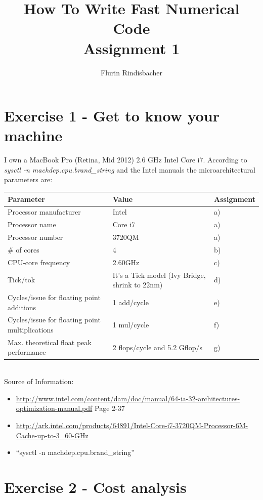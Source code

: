 \documentclass[10pt,a4paper,oneside,notitlepage]{report}
\author{Flurin Rindisbacher}
\title{How To Write Fast Numerical Code \\ \vspace{6 mm} \textbf{Assignment 1}}
\begin{document}
\maketitle

\section*{Exercise 1 - Get to know your machine}
I own a MacBook Pro (Retina, Mid 2012) 2.6 GHz Intel Core i7. According to \textit{sysctl -n machdep.cpu.brand\_string} and the Intel manuals the microarchitectural parameters are: \\

\begin{tabular}{|l|l|l|}
\hline 
\rowcolor{gray!30}
\textbf{Parameter} & \textbf{Value} & \textbf{Assignment} \\ 
\hline 
Processor manufacturer & Intel & a)\\ 
\hline 
Processor name & Core i7 & a)\\ 
\hline
Processor number & 3720QM  & a)\\ 
\hline
\# of cores & 4  & b) \\ 
\hline 
CPU-core frequency & 2.60GHz  & c)\\ 
\hline 
Tick/tok & It's a Tick model (Ivy Bridge, shrink to 22nm) & d) \\ 
\hline 
Cycles/issue for floating point additions & 1 add/cycle & e) \\ 
\hline 
Cycles/issue for floating point multiplications & 1 mul/cycle & f) \\ 
\hline 
Max. theoretical float peak performance & 2 flops/cycle and 5.2 Gflop/s & g) \\ 
\hline 
\end{tabular} 
\\
Source of Information:
\begin{itemize}
  \item \url{http://www.intel.com/content/dam/doc/manual/64-ia-32-architectures-optimization-manual.pdf} Page 2-37
  \item \url{http://ark.intel.com/products/64891/Intel-Core-i7-3720QM-Processor-6M-Cache-up-to-3_60-GHz}
  \item ``sysctl -n machdep.cpu.brand\_string''
\end{itemize}

\section*{Exercise 2 - Cost analysis}
\end{document}
